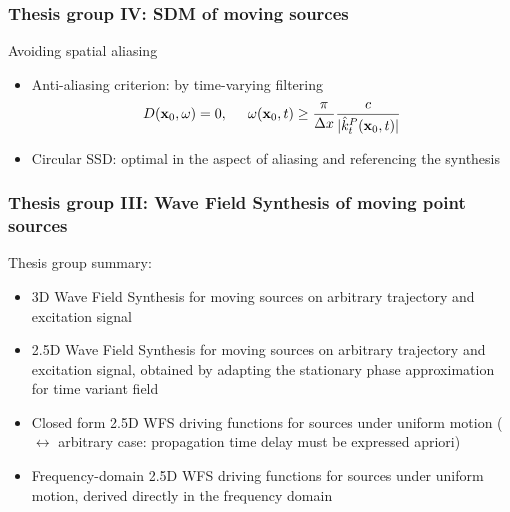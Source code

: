 \documentclass{beamer}
\begin{document}
\begin{frame}
\frametitle{Thesis group IV: SDM of moving sources}
\small
Avoiding spatial aliasing
\begin{itemize}
\vspace{-3mm}
\item Anti-aliasing criterion: by time-varying filtering
		\begin{equation*}
		D(\mathbf{x}_0,\omega) = 0, \hspace{5mm} \omega(\mathbf{x}_0,t) \geq \frac{\pi}{\Delta x} \frac{c}{| \hat{k}^P_t(\mathbf{x}_0,t) |}
		\end{equation*}
\vspace{-2mm}
\item Circular SSD: optimal in the aspect of aliasing and referencing the synthesis
\end{itemize}
\end{frame}

\begin{frame}
\frametitle{Thesis group III: Wave Field Synthesis of moving point sources}
Thesis group summary:
	\vspace{3mm}	
	\begin{itemize}
	\item 3D Wave Field Synthesis for moving sources on arbitrary trajectory and excitation signal
	\vspace{3mm}	
	\item 2.5D Wave Field Synthesis for moving sources on arbitrary trajectory and excitation signal, obtained by adapting the stationary phase approximation for time variant field
	\vspace{3mm}	
	\item Closed form 2.5D WFS driving functions for sources under uniform motion ($\leftrightarrow$ arbitrary case: propagation time delay must be expressed apriori)
	\vspace{3mm}	
	\item Frequency-domain 2.5D WFS driving functions for sources under uniform motion, derived directly in the frequency domain
	\end{itemize}
\end{frame}
\end{document}
